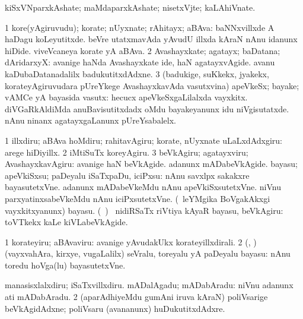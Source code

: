 {\bentry
{} 
\gl{\nA}
\expl{}
\bmng
kiSxVNparxkAshate; maMdaparxkAshate; nisetxVjte; kaLAhiVnate. 
\emng
\eentry

\bentry
{} 
\gl{\nA}
\expl{}
\bmng
\bnum
\num{1} kore(yAgiruvudu); korate; nUyxnate; rAhitayx; aBAva:  baNNxvillxde A haDagu koLeyutitxde.  beVre utatxmavAda yAvudU illxda kAraN nAnu idanunx hiDide.  viveVcaneya korate yA aBAva. 
\num{2} Avashayxkate; agatayx; baDatana; dAridarxyX:  avanige haNda Avashayxkate ide, haN agatayxvAgide.  avanu kaDubaDatanadalilx badukutitxdAdxne. 
\num{3} (badukige, suKkekx, jyakekx, korateyAgiruvudara pUreYkege AvashayxkavAda vasutxvina) apeVkeSx; bayake; vAMCe yA bayasida vasutx:  hecucx apeVkeSxgaLilalxda vayxkitx.  diVGaRkAldiMda anuBavisutitxdadx oMdu bayakeyanunx idu niVgisutatxde.  nAnu ninanx agatayxgaLanunx pUreYsabalelx. 
\enum
\emng
\eentry

\bentry
{} 
\gl{\sakirx}
\expl{}
\bmng
\bnum
\num{1} illxdiru; aBAva hoMdiru; rahitavAgiru; korate, nUyxnate uLaLxdAdxgiru:  arege hiDiyillx. 
\num{2} iMtiSuTx koreyAgiru. 
\num{3} beVkAgiru; agatayxviru; AvashayxkavAgiru:  avanige haN beVkAgide.  adanunx mADabeVkAgide. 
\banum
{} bayasu; apeVkiSxsu; paDeyalu iSaTxpaDu, iciPxsu:  nAnu savxlpx sakakxre bayasutetxVne.  adanunx mADabeVkeMdu nAnu apeVkiSxsutetxVne.  niVnu parxyatinxsabeVkeMdu nAnu iciPxsutetxVne. 
 (\kanmu\ leYMgika BoVgakAkxgi vayxkitxyanunx) bayasu. 
 (\kanmu\ \birx) \kanmu\ nidiRSaTx riVtiya kAyaR bayasu, beVkAgiru:  toVTkekx kaLe kiVLabeVkAgide. 
\eanum
\numie
\enum
\emng

  \noindent 
\gl{\akirx}
\expl{}
\bmng
\bnum
\num{1} korateyiru; aBAvaviru:  avanige yAvudakUkx korateyillxdirali. 
\num{2} (\ame, \AmA) (vayxvahAra, kirxye, \mo vugaLalilx) seVralu, toreyalu yA paDeyalu bayasu:  nAnu toredu hoVga(lu) bayasutetxVne. 
\enum
\emng

\noindent 
\gl{\pagu}
\expl{}
\bmng
\bnum
{}  
\banum
{} manasisxlalxdiru; iSaTxvillxdiru. 
 mADalAgadu; mADabAradu:  niVnu adanunx ati mADabAradu. 
\eanum
\numie
\num{2}  (aparAdhiyeMdu gumAni iruva kAraN) poliVsarige beVkAgidAdxne; poliVsaru (avananunx) huDukutitxdAdxre. 
\enum
\emng
\eentry

}
